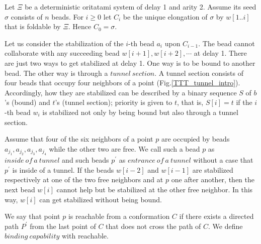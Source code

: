 \documentclass[runningheads]{llncs}
\begin{document}
Let $\Xi$ be a deterministic oritatami system of delay 1 and arity 2. Assume its seed $\sigma$ consists of $n$ beads.
For $i \geq 0$ let $C_i$ be the unique elongation of $\sigma$ by $w[1..i]$ that is foldable by $\Xi$. Hence $C_0 = \sigma$.


Let us consider the stabilization of the $i$-th bead $a_i$ upon $C_{i-1}$. The bead cannot collaborate with any succeeding bead $w[i+1],w[i+2],\cdots$ at delay 1. There are just two ways to get stabilized at delay 1. One way is to be bound to another bead. The other way is through a $tunnel\ section$. A tunnel section consists of four beads that occupy four neighbors of a point (Fig.\ref{TTT_tunnel_intro}). 
Accordingly, how they are stabilized can be described by a binary sequence $S$ of $b$'s (bound) and $t$'s (tunnel section); priority is given to $t$, that is, $S[i] = t$ if the $i$-th bead $w_i$ is stabilized not only by being bound but also through a tunnel section. 

Assume that four of the six neighbors of a point $p$ are occupied by beads $a_{j_1},a_{j_2},a_{j_3},a_{j_4}$ while the other two are free. We call such a bead $p$ as $inside\ of\ a\ tunnel$ and such beads $p^\prime$ as $entrance\ of\ a\ tunnel$ without a case that $p^\prime$ is inside of a tunnel. If the beads $w[i-2]$ and $w[i-1]$ are stabilized respectively at one of the two free neighbors and at $p$ one after another, then the next bead $w[i]$ cannot help but be stabilized at the other free neighbor. In this way, $w[i]$ can get stabilized without being bound.


We say that point $p$ is reachable from a conformation $C$ if there exists a directed path $P^\prime$ from the last point of $C$ that does not cross the path of $C$. We define $binding\ capability$ with reachable.
\end{document}
